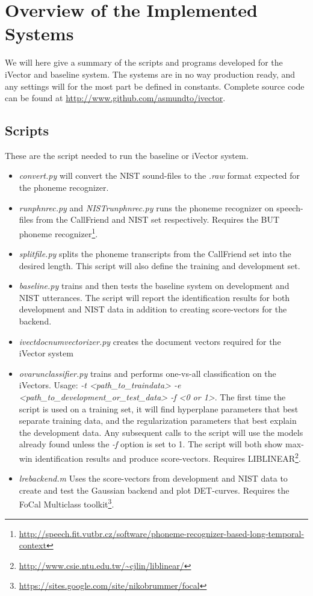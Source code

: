\chapter{Overview of the Implemented Systems}

We will here give a summary of the scripts and programs developed for the iVector and baseline system. The systems are in no way production ready, and any settings will for the most part be defined in constants. Complete source code can be found at \url{http://www.github.com/asmundto/ivector}.

\section{Scripts}

These are the script needed to run the baseline or iVector system.

\begin{itemize}
	\item \emph{convert.py} will convert the NIST sound-files to the \emph{.raw} format expected for the phoneme recognizer.
	\item \emph{runphnrec.py} and \emph{NISTrunphnrec.py} runs the phoneme recognizer on speech-files from the CallFriend and NIST set respectively. Requires the BUT phoneme recognizer\footnote{\url{http://speech.fit.vutbr.cz/software/phoneme-recognizer-based-long-temporal-context}}.
	\item \emph{splitfile.py} splits the phoneme transcripts from the CallFriend set into the desired length. This script will also define the training and development set. 
	\item \emph{baseline.py} trains and then tests the baseline system on development and NIST utterances. The script will report the identification results for both development and NIST data in addition to creating score-vectors for the backend.
	\item \emph{ivectdocnumvectorizer.py} creates the document vectors required for the iVector system
	\item \emph{ovarunclassifier.py} trains and performs one-vs-all classification on the iVectors. Usage: \emph{-t <path\_to\_traindata> -e <path\_to\_development\_or\_test\_data> -f <0 or 1>}. The first time the script is used on a training set, it will find hyperplane parameters that best separate training data, and the regularization parameters that best explain the development data. Any subsequent calls to the script will use the models already found unless the \emph{-f} option is set to 1. The script will both show max-win identification results and produce score-vectors. Requires LIBLINEAR\footnote{\url{http://www.csie.ntu.edu.tw/~cjlin/liblinear/}}.
	\item \emph{lrebackend.m} Uses the score-vectors from development and NIST data to create and test the Gaussian backend and plot DET-curves. Requires the FoCal Multiclass toolkit\footnote{\url{https://sites.google.com/site/nikobrummer/focal}}.
\end{itemize}

